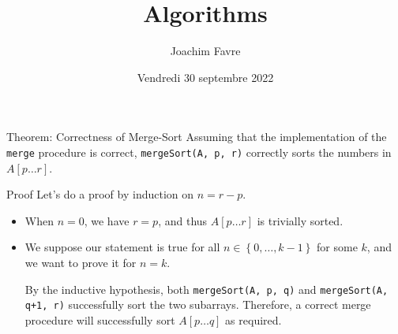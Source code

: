 \documentclass[a4paper]{article}
\title{Algorithms}
\author{Joachim Favre}
\date{Vendredi 30 septembre 2022}
\begin{document}
\maketitle


\begin{parag}{Theorem: Correctness of Merge-Sort}
    Assuming that the implementation of the \texttt{merge} procedure is correct, \texttt{mergeSort(A, p, r)} correctly sorts the numbers in $A\left[p\ldots r\right]$.

    \begin{subparag}{Proof}
        Let's do a proof by induction on $n = r -p$.

        \begin{itemize}[left=0pt]
            \item When $n = 0$, we have $r = p$, and thus $A\left[p \ldots r\right]$ is trivially sorted.
            \item We suppose our statement is true for all $n \in \left\{0, \ldots, k-1\right\}$ for some $k$, and we want to prove it for $n = k$.

            By the inductive hypothesis, both \texttt{mergeSort(A, p, q)} and \texttt{mergeSort(A, q+1, r)} successfully sort the two subarrays. Therefore, a correct merge procedure will successfully sort $A\left[p\ldots q\right]$ as required.
        \end{itemize}
    \end{subparag}
\end{parag}
\end{document}
